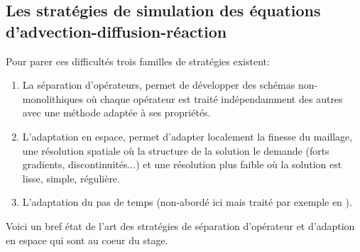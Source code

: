 \subsection{Les stratégies de simulation des équations d'advection-diffusion-réaction}
    \label{par:intro_etat_art}
    Pour parer ces difficultés trois familles de stratégies existent:
    \begin{enumerate}[label=\Alph*.]
        \item La séparation d'opérateurs, permet de développer des schémas non-monolithiques où chaque opérateur est traité indépendamment des autres avec une méthode adaptée à ses propriétés. 
        \item L'adaptation en espace, permet d'adapter localement la finesse du maillage, une résolution spatiale où la structure de la solution le demande (forts gradients, discontinuités...)
        et une résolution plus faible où la solution est lisse, simple, régulière.
        \item L'adaptation du pas de temps (non-abordé ici mais traité par exemple en \cite{duart2011}).
    \end{enumerate}
    Voici un bref état de l'art des stratégies de séparation d'opérateur et d'adaption en espace qui sont au coeur du stage.
